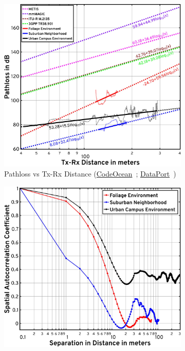 \documentclass[10pt, twocolumn]{IEEEtran}
\begin{document}
{\begin{figure} [t]
    \centering
    \begin{subfigure}{0.49\linewidth}
        \centering
        \includegraphics[width=0.95\linewidth]{figs/pathloss_vs_distance.pdf}
        \caption{Pathloss vs Tx-Rx Distance (\href{https://codeocean.com/capsule/9545863/tree}{CodeOcean}~\cite{CodeOcean}; \href{http://ieee-dataport.org/12580}{DataPort}~\cite{DataPort})}
        \label{F7a}
    \end{subfigure}
    \begin{subfigure}{0.5\linewidth}
        \centering
        \includegraphics[width=0.95\linewidth]{figs/spatial_consistency_vs_distance.pdf}

\end{subfigure}
\end{figure}}
\end{document}
